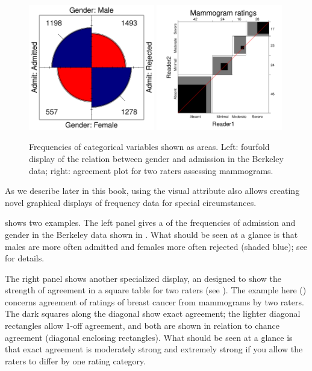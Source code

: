 \documentclass[10pt,krantz2]{krantz}\usepackage[]{graphicx}\usepackage[]{color}
\begin{document}
\begin{figure}
  \centering
  \includegraphics[width=0.49\textwidth]{ch01/fig/berk-fourfold3}
  \includegraphics[width=0.49\textwidth]{ch01/fig/mammograms1}
  \caption{Frequencies of categorical variables shown as areas. Left: fourfold display of the relation between gender and admission in the Berkeley data; right: agreement plot for two raters assessing mammograms. }
  \label{fig:area-diagrams}
\end{figure}

As we describe later in this book, using the visual  attribute
also allows creating novel graphical displays of frequency data
for special circumstances.

 shows two examples.
The left panel gives a  of the frequencies
of admission and gender in the Berkeley data shown in
.
What should be seen at a glance is that males are more often admitted
and females more often rejected (shaded blue); see 
for details.

The right panel shows another specialized display, an 
designed to show the strength of agreement in a square table for two raters
(see ).  The example here ()
concerns agreement of ratings of breast cancer from mammograms by two raters.
The dark squares along the diagonal show exact agreement; the lighter diagonal
rectangles allow 1-off agreement, and both are shown in relation to chance
agreement (diagonal enclosing rectangles).  What should be seen at a glance
is that exact agreement is moderately strong and extremely strong if you allow
the raters to differ by one rating category.
\end{document}
